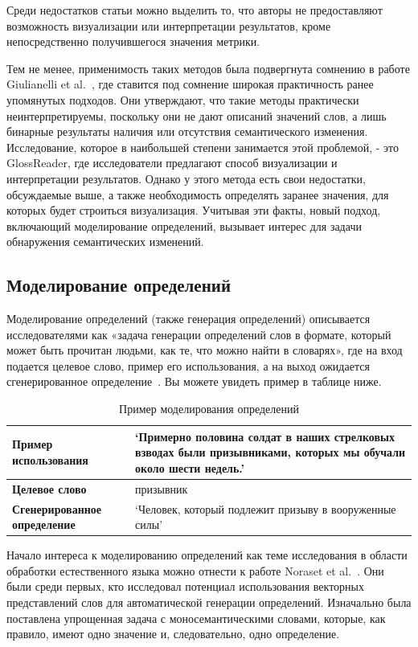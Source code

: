 \documentclass[LI,VKR]{HSEUniversity}
\begin{document}
Среди недостатков статьи можно выделить то, что авторы не предоставляют возможность визуализации
или интерпретации результатов, кроме непосредственно получившегося значения метрики.

Тем не менее, применимость таких методов была подвергнута сомнению в работе
Giulianelli et al.~\cite{DefinitionGenerationMainArticle},
где ставится под сомнение широкая практичность ранее упомянутых подходов.
Они утверждают, что такие методы практически неинтерпретируемы,
поскольку они не дают описаний значений слов,
а лишь бинарные результаты наличия или отсутствия семантического изменения.
Исследование, которое в наибольшей степени занимается этой проблемой, - это GlossReader,
где исследователи предлагают способ визуализации и интерпретации результатов.
Однако у этого метода есть свои недостатки, обсуждаемые выше, а также
необходимость определять заранее значения, для которых будет строиться визуализация.
Учитывая эти факты, новый подход, включающий моделирование определений,
вызывает интерес для задачи обнаружения семантических изменений.

\subsection{Моделирование определений}

Моделирование определений (также генерация определений) описывается исследователями как
«задача генерации определений слов в формате,
который может быть прочитан людьми, как те, что можно найти в словарях»,
где на вход подается целевое слово, пример его использования, а на выход
ожидается сгенерированное определение~\cite{DefinitionGenerationMainArticle}.
Вы можете увидеть пример в таблице ниже.

\begin{table}[H]
\centering
\caption{Пример моделирования определений}
\begin{tabular}{|l|p{8cm}|}
\hline
\textbf{Пример использования} & ‘Примерно половина солдат в наших стрелковых взводах были призывниками, которых мы обучали около шести недель.’ \\
\hline
\textbf{Целевое слово} & призывник \\
\hline
\textbf{Сгенерированное определение} & ‘Человек, который подлежит призыву в вооруженные силы’ \\
\hline
\end{tabular}
\end{table}

Начало интереса к моделированию определений как теме исследования
в области обработки естественного языка можно отнести
к работе Noraset et al.~\cite{noraset2016definition}.
Они были среди первых, кто исследовал потенциал использования векторных представлений слов
для автоматической генерации определений.
Изначально была поставлена упрощенная задача с моносемантическими словами,
которые, как правило, имеют одно значение и, следовательно, одно определение.
\end{document}
